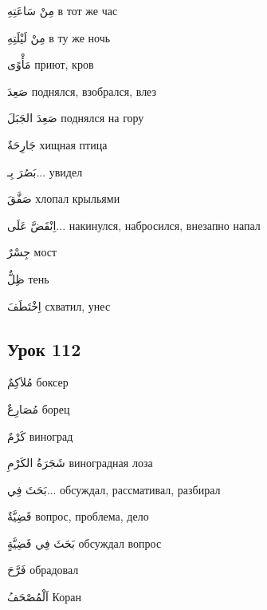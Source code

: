 \documentclass[a5paper]{article}
\newcommand\textstyleDropCaps[1]{#1}
\newcommand\textstyleCaptioncharacters[1]{#1}
\begin{document}
\textstyleCaptioncharacters{مِنْ سَاعَتِهِ }\textstyleDropCaps{в тот же час‎}

\textstyleCaptioncharacters{مِنْ لَيْلَتِهِ }\textstyleDropCaps{в ту же ночь‎}

\textstyleCaptioncharacters{مَأْوًى }\textstyleDropCaps{приют, кров‎}

\textstyleCaptioncharacters{صَعِدَ }\textstyleDropCaps{поднялся, взобрал­ся, влез‎}

\textstyleCaptioncharacters{صَعِدَ الجَبَلَ }\textstyleDropCaps{поднялся на гору‎}

\textstyleCaptioncharacters{جَارِحَةٌ }\textstyleDropCaps{хищная птица‎}

\textstyleCaptioncharacters{بَصُرَ بِـ... }\textstyleDropCaps{увидел‎}

\textstyleCaptioncharacters{صَفَّقَ }\textstyleDropCaps{хлопал крыльями‎}

\textstyleCaptioncharacters{اِنْقَضَّ عَلَى... }\textstyleDropCaps{накинул­ся, набросился, внезапно напал‎}

\textstyleCaptioncharacters{جِسْرٌ }\textstyleDropCaps{мост‎}

\textstyleCaptioncharacters{ظِلٌّ }\textstyleDropCaps{тень‎}

\textstyleCaptioncharacters{اِخْتَطَفَ }\textstyleDropCaps{схватил, унес‎}

\subsection[Урок 112‎]{\textstyleDropCaps{Урок 112‎}}
\textstyleCaptioncharacters{مُلاَكِمٌ }\textstyleDropCaps{боксер‎}

\textstyleCaptioncharacters{مُصَارِعٌ }\textstyleDropCaps{борец‎}

\textstyleCaptioncharacters{كَرْمٌ }\textstyleDropCaps{виноград‎}

\textstyleCaptioncharacters{شَجَرَةُ الكَرْمِ }\textstyleDropCaps{виноград­ная лоза‎}

\textstyleCaptioncharacters{بَحَثَ فِي... }\textstyleDropCaps{обсуждал, рассмативал, разбирал‎}

\textstyleCaptioncharacters{قَضِيَّةٌ }\textstyleDropCaps{вопрос, проблема, дело‎}

\textstyleCaptioncharacters{بَحَثَ فِي قَضِيَّةٍ }\textstyleDropCaps{обсу­ждал вопрос‎}

\textstyleCaptioncharacters{فَرَّحَ }\textstyleDropCaps{обрадовал‎}

\textstyleCaptioncharacters{اَلْمُصْحَفُ }\textstyleDropCaps{Коран‎}
\end{document}
